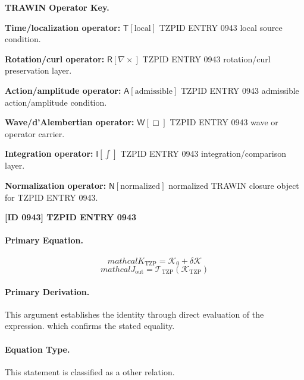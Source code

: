 \par\vspace{0.45\baselineskip}
\noindent\begin{minipage}[t]{\linewidth}
\begingroup
\small
\raggedright
\textbf{TRAWIN Operator Key.}\par
\noindent\textbf{Time/localization operator:} $\mathsf{T}\!\left[\mathrm{local}\right]$ TZPID ENTRY 0943 local source condition.\par
\noindent\textbf{Rotation/curl operator:} $\mathsf{R}\!\left[\nabla\times\right]$ TZPID ENTRY 0943 rotation/curl preservation layer.\par
\noindent\textbf{Action/amplitude operator:} $\mathsf{A}\!\left[\mathrm{admissible}\right]$ TZPID ENTRY 0943 admissible action/amplitude condition.\par
\noindent\textbf{Wave/d'Alembertian operator:} $\mathsf{W}\!\left[\Box\right]$ TZPID ENTRY 0943 wave or operator carrier.\par
\noindent\textbf{Integration operator:} $\mathsf{I}\!\left[\int\right]$ TZPID ENTRY 0943 integration/comparison layer.\par
\noindent\textbf{Normalization operator:} $\mathsf{N}\!\left[\mathrm{normalized}\right]$ normalized TRAWIN closure object for TZPID ENTRY 0943.\par
\endgroup
\end{minipage}

\clearpage
\noindent\textbf{[ID 0943] TZPID ENTRY 0943}\par
\vspace{0.35em}
\paragraph{Primary Equation.}
\[
mathcal{K}_{\mathrm{TZP}} = \mathcal{K}_0 + \delta \mathcal{K}
\]
\[
mathcal{J}_{\mathrm{out}} = \mathcal{T}_{\mathrm{TZP}}\!\left(\mathcal{K}_{\mathrm{TZP}}\right)
\]

\paragraph{Primary Derivation.}
This argument establishes the identity through direct evaluation of the expression. which confirms the stated equality.
\paragraph{Equation Type.}
This statement is classified as a other relation.

